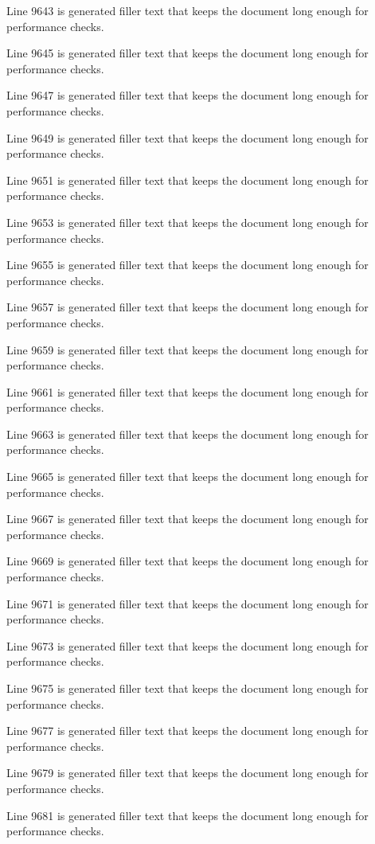 Line 9643 is generated filler text that keeps the document long enough for performance checks.

Line 9645 is generated filler text that keeps the document long enough for performance checks.

Line 9647 is generated filler text that keeps the document long enough for performance checks.

Line 9649 is generated filler text that keeps the document long enough for performance checks.

Line 9651 is generated filler text that keeps the document long enough for performance checks.

Line 9653 is generated filler text that keeps the document long enough for performance checks.

Line 9655 is generated filler text that keeps the document long enough for performance checks.

Line 9657 is generated filler text that keeps the document long enough for performance checks.

Line 9659 is generated filler text that keeps the document long enough for performance checks.

Line 9661 is generated filler text that keeps the document long enough for performance checks.

Line 9663 is generated filler text that keeps the document long enough for performance checks.

Line 9665 is generated filler text that keeps the document long enough for performance checks.

Line 9667 is generated filler text that keeps the document long enough for performance checks.

Line 9669 is generated filler text that keeps the document long enough for performance checks.

Line 9671 is generated filler text that keeps the document long enough for performance checks.

Line 9673 is generated filler text that keeps the document long enough for performance checks.

Line 9675 is generated filler text that keeps the document long enough for performance checks.

Line 9677 is generated filler text that keeps the document long enough for performance checks.

Line 9679 is generated filler text that keeps the document long enough for performance checks.

Line 9681 is generated filler text that keeps the document long enough for performance checks.

